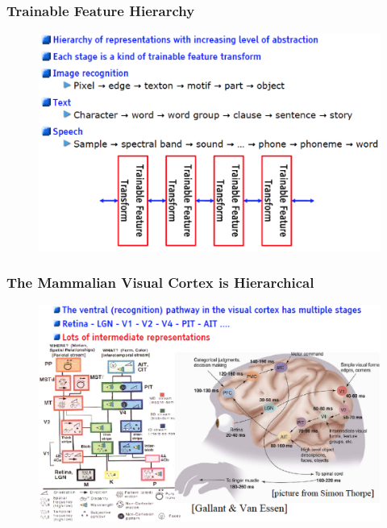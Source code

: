 \documentclass{beamer}
\begin{document}
\begin{frame}
\frametitle{Trainable Feature Hierarchy}
\begin{figure}
      \includegraphics[width=1\textwidth]{figs/intro4.png}
\end{figure}
\end{frame}

\begin{frame}
\frametitle{The Mammalian Visual Cortex is Hierarchical}
\begin{figure}
      \includegraphics[width=1\textwidth]{figs/intro5.png}
\end{figure}
\end{frame}
\end{document}
